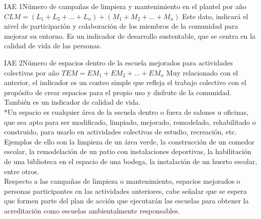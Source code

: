 \begin{indicador}{IAE 1}{Número de campañas de limpieza y mantenimiento en el plantel por año}
	{$CLM = (L_1 + L_2 + ... + L_n) + (M_1 + M_2 + ... + M_n)$} 
	{
		Este dato, indicará el nivel de participación y colaboración de los miembros de la comunidad para mejorar su entorno. Es un indicador de desarrollo sustentable, que se centra en la calidad de vida de las personas.
	} 	
\end{indicador}
\begin{indicador}{IAE 2}{Número de espacios dentro de la escuela mejorados para actividades colectivas por año}
	{$TEM = EM_1 + EM_2 + ... + EM_n$}
	{
		Muy relacionado con el anterior, el indicador es un conteo simple que refleja el trabajo colectivo con el propósito de crear espacios para el propio uso y disfrute de la comunidad. También es un indicador de calidad de vida.\\
		
		*Un espacio es cualquier área de la escuela dentro o fuera de salones u oficinas, que sea apto para ser modificado, limpiado, mejorado, remodelado, rehabilitado o construido, 
		para usarlo en actividades colectivas de estudio, recreación, etc. Ejemplos de ello son la limpieza de un área verde, la construcción de un comedor escolar, la remodelación de un patio con instalaciones deportivas, 
		la habilitación de una biblioteca en el espacio de una bodega, la instalación de un huerto escolar, entre otros.\\
		
		Respecto a las campañas de limpieza o mantenimiento, espacios mejorados o personas participantes en las actividades anteriores, cabe señalar que se espera que formen parte del plan de acción que ejecutarán las 
		escuelas para obtener la acreditación como escuelas ambientalmente responsables.
	} 	
\end{indicador}

